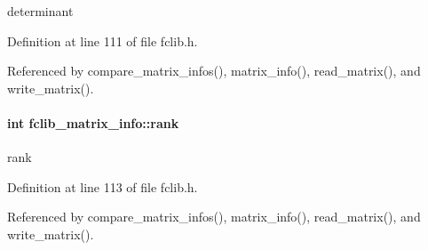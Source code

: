 determinant 



Definition at line 111 of file fclib.\-h.



Referenced by compare\-\_\-matrix\-\_\-infos(), matrix\-\_\-info(), read\-\_\-matrix(), and write\-\_\-matrix().

\hypertarget{structfclib__matrix__info_af838043a1769956958c4a66e6227227d}{
\paragraph[{rank}]{\setlength{\rightskip}{0pt plus 5cm}int fclib\-\_\-matrix\-\_\-info\-::rank}}\label{structfclib__matrix__info_af838043a1769956958c4a66e6227227d}


rank 



Definition at line 113 of file fclib.\-h.



Referenced by compare\-\_\-matrix\-\_\-infos(), matrix\-\_\-info(), read\-\_\-matrix(), and write\-\_\-matrix().

